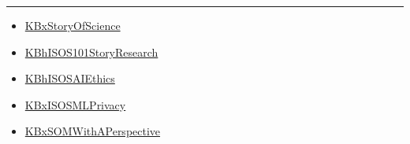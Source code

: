 \documentclass[letterpaper]{article}
\begin{document}
\noindent\rule{\textwidth}{0.5pt}

\begin{itemize}
\item \href{KBxStoryOfScience.org}{KBxStoryOfScience}
\item \href{KBhISOS101StoryResearch.org}{KBhISOS101StoryResearch}
\item \href{KBhISOSAIEthics.org}{KBhISOSAIEthics}
\item \href{KBxISOSMLPrivacy.org}{KBxISOSMLPrivacy}
\item \href{KBxSOMWithAPerspective.org}{KBxSOMWithAPerspective}
\end{itemize}
\end{document}
